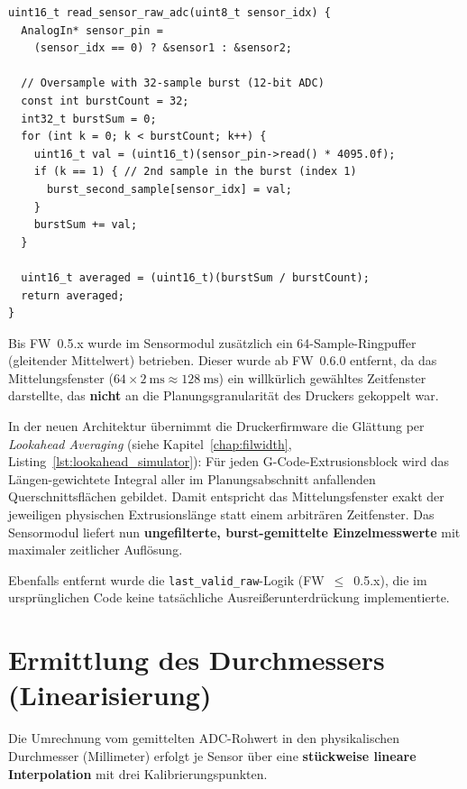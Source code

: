 \begin{lstlisting}[style=firmwarestyle, caption={ADC-Burst-Oversampling mit Rohwert-Capture (\texttt{read\_sensor\_raw\_adc}, Z.~157--173).}, label={lst:sensor_adc_burst}]
uint16_t read_sensor_raw_adc(uint8_t sensor_idx) {
  AnalogIn* sensor_pin =
    (sensor_idx == 0) ? &sensor1 : &sensor2;

  // Oversample with 32-sample burst (12-bit ADC)
  const int burstCount = 32;
  int32_t burstSum = 0;
  for (int k = 0; k < burstCount; k++) {
    uint16_t val = (uint16_t)(sensor_pin->read() * 4095.0f);
    if (k == 1) { // 2nd sample in the burst (index 1)
      burst_second_sample[sensor_idx] = val;
    }
    burstSum += val;
  }

  uint16_t averaged = (uint16_t)(burstSum / burstCount);
  return averaged;
}
\end{lstlisting}


Bis FW~0.5.x wurde im Sensormodul zusätzlich ein 64-Sample-Ringpuffer (gleitender Mittelwert) betrieben.
Dieser wurde ab FW~0.6.0 entfernt, da das Mittelungsfenster ($64 \times \qty{2}{\milli\second} \approx \qty{128}{\milli\second}$) ein willkürlich gewähltes Zeitfenster darstellte, das \textbf{nicht} an die Planungsgranularität des Druckers gekoppelt war.

In der neuen Architektur übernimmt die Druckerfirmware die Glättung per \emph{Lookahead Averaging} (siehe Kapitel~\ref{chap:filwidth}, Listing~\ref{lst:lookahead_simulator}): Für jeden G-Code-Extrusionsblock wird das Längen-gewichtete Integral aller im Planungsabschnitt anfallenden Querschnittsflächen gebildet.
Damit entspricht das Mittelungsfenster exakt der jeweiligen physischen Extrusionslänge statt einem arbiträren Zeitfenster.
Das Sensormodul liefert nun \textbf{ungefilterte, burst-gemittelte Einzelmesswerte} mit maximaler zeitlicher Auflösung.

Ebenfalls entfernt wurde die \texttt{last\_valid\_raw}-Logik (FW~$\leq$~0.5.x), die im ursprünglichen Code keine tatsächliche Ausreißerunterdrückung implementierte.

\section{Ermittlung des Durchmessers (Linearisierung)}
\label{sec:sensor_linearisierung}

Die Umrechnung vom gemittelten ADC-Rohwert in den physikalischen Durchmesser (Millimeter) erfolgt je Sensor über eine \textbf{stückweise lineare Interpolation} mit drei Kalibrierungspunkten.

